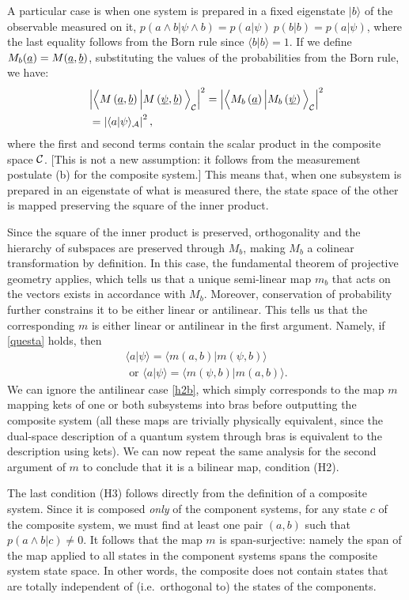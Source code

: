 \documentclass[aps,prl,amsmath,amssymb,twocolumn,nofootinbib]{revtex4}
\theoremstyle{plain}
\theoremstyle{definition}
\theoremstyle{remark}
\newcommand{\pj}[1] {\underbar{$#1$}}
\def\>{\rangle}
\def\<{\langle}
\def\labell#1{\label{#1}}
\begin{document}
	A particular case is when one system is
	prepared in a fixed eigenstate $|b\>$ of the observable measured on it,
	$p(a\wedge b|\psi\wedge b)=p(a|\psi)\:p(b|b)=p(a|\psi)$, where the last equality follows from the Born rule since $\<b|b\>=1$. 
	If we define $M_b(\pj{a}) = M(\pj{a},\pj{b})$, substituting the values of the
	probabilities from the Born rule, we have:
	\begin{align} &\Big|\Big\<M\left(\pj{a},\pj{b}\right)\Big|M\left(\pj{\psi},\pj{b}\right)\Big\>_{\cal C}\Big|^2
	=\Big|\Big\<M_b\left(\pj{a}\right)\Big|M_b\left(\pj{\psi}\right)\Big\>_{\cal C}\Big|^2
	\nonumber \\&
	=\left|\<a|\psi\>_{\cal A}\right|^2
	\labell{questa},
	\end{align}
	where the first and second terms contain the scalar product in the composite
	space $\cal C$. [This is not a new assumption: it follows from the
	measurement postulate (b) for the composite system.] This means that,
	when one subsystem is prepared in an eigenstate of what is measured
	there, the state space of the other is mapped preserving the square of
	the inner product.
	
	Since the square of the inner product is preserved, orthogonality and
	the hierarchy of subspaces are preserved through $M_b$, making $M_b$ a
	colinear transformation by definition. In this case, the fundamental
	theorem of projective geometry \cite{fun} applies, which tells us that
	a unique semi-linear map $m_b$ that acts on the vectors exists in accordance with $M_b$.
	Moreover, conservation of probability further constrains it to be
	either linear or antilinear. This tells us that the corresponding $m$
	is either linear or antilinear in the first argument. Namely, if
	\eqref{questa} holds, then
	\begin{align}
	\<a|\psi\>=\<m(a,b)|m(\psi,b)\>\labell{h2}\;
	\\\mbox{ or }
	\<a|\psi\>=\<m(\psi,b)|m(a,b)\> \labell{h2b}.
	\end{align}
	We can ignore the antilinear case \eqref{h2b}, which simply
	corresponds to the map $m$ mapping kets of one or both subsystems into
	bras before outputting the composite system (all these maps are
	trivially physically equivalent, since the dual-space description of a
	quantum system through bras is equivalent to the description using
	kets). We can now repeat the same analysis for the second argument of
	$m$ to conclude that it is a bilinear map, condition (H2).
	
	The last condition (H3) follows directly from the definition of a
	composite system. Since it is composed {\em only} of the component
	systems, for any state $c$ of the composite system, we must find at least one pair $(a, b)$ such that $p(a\wedge b | c)\neq 0$. It follows that the map $m$ is span-surjective: namely the
	span of the map applied to all states in the component systems spans
	the composite system state space. In other words, the composite does
	not contain states that are totally independent of (i.e.~orthogonal
	to) the states of the components.
	
\end{document}

